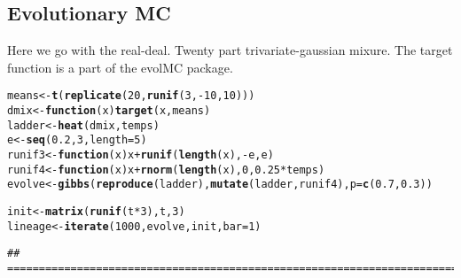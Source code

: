 \documentclass{article}\usepackage[]{graphicx}\usepackage[]{color}
\makeatletter
\newcommand{\hlnum}[1]{\textcolor[rgb]{0.686,0.059,0.569}{#1}}%
\newcommand{\hlopt}[1]{\textcolor[rgb]{0,0,0}{#1}}%
\newcommand{\hlstd}[1]{\textcolor[rgb]{0.345,0.345,0.345}{#1}}%
\newcommand{\hlkwa}[1]{\textcolor[rgb]{0.161,0.373,0.58}{\textbf{#1}}}%
\newcommand{\hlkwb}[1]{\textcolor[rgb]{0.69,0.353,0.396}{#1}}%
\newcommand{\hlkwc}[1]{\textcolor[rgb]{0.333,0.667,0.333}{#1}}%
\newcommand{\hlkwd}[1]{\textcolor[rgb]{0.737,0.353,0.396}{\textbf{#1}}}%
\newenvironment{kframe}{%
 \def\at@end@of@kframe{}%
 \ifinner\ifhmode%
  \def\at@end@of@kframe{\end{minipage}}%
  \begin{minipage}{\columnwidth}%
 \fi\fi%
 \def\FrameCommand##1{\hskip\@totalleftmargin \hskip-\fboxsep
 \colorbox{shadecolor}{##1}\hskip-\fboxsep
     \hskip-\linewidth \hskip-\@totalleftmargin \hskip\columnwidth}%
 \MakeFramed {\advance\hsize-\width
   \@totalleftmargin\z@ \linewidth\hsize
   \@setminipage}}%
 {\par\unskip\endMakeFramed%
 \at@end@of@kframe}
\newenvironment{knitrout}{}{} %
\makeatother
\begin{document}
\subsection{Evolutionary MC}

Here we go with the real-deal. Twenty part trivariate-gaussian mixure.
The target function is a part of the evolMC package. 

\begin{knitrout}
\color{fgcolor}\begin{kframe}
\begin{alltt}
\hlstd{means} \hlkwb{<-} \hlkwd{t}\hlstd{(}\hlkwd{replicate}\hlstd{(}\hlnum{20}\hlstd{,} \hlkwd{runif}\hlstd{(}\hlnum{3}\hlstd{,} \hlopt{-}\hlnum{10}\hlstd{,} \hlnum{10}\hlstd{)))}
\hlstd{dmix} \hlkwb{<-} \hlkwa{function}\hlstd{(}\hlkwc{x}\hlstd{)} \hlkwd{target}\hlstd{(x, means)}
\hlstd{ladder} \hlkwb{<-} \hlkwd{heat}\hlstd{(dmix, temps)}
\hlstd{e} \hlkwb{<-} \hlkwd{seq}\hlstd{(}\hlnum{0.2}\hlstd{,} \hlnum{3}\hlstd{,} \hlkwc{length} \hlstd{=} \hlnum{5}\hlstd{)}
\hlstd{runif3} \hlkwb{<-} \hlkwa{function}\hlstd{(}\hlkwc{x}\hlstd{) x} \hlopt{+} \hlkwd{runif}\hlstd{(}\hlkwd{length}\hlstd{(x),} \hlopt{-}\hlstd{e, e)}
\hlstd{runif4} \hlkwb{<-} \hlkwa{function}\hlstd{(}\hlkwc{x}\hlstd{) x} \hlopt{+} \hlkwd{rnorm}\hlstd{(}\hlkwd{length}\hlstd{(x),} \hlnum{0}\hlstd{,} \hlnum{0.25} \hlopt{*} \hlstd{temps)}
\hlstd{evolve} \hlkwb{<-} \hlkwd{gibbs}\hlstd{(}\hlkwd{reproduce}\hlstd{(ladder),} \hlkwd{mutate}\hlstd{(ladder, runif4),} \hlkwc{p} \hlstd{=} \hlkwd{c}\hlstd{(}\hlnum{0.7}\hlstd{,} \hlnum{0.3}\hlstd{))}

\hlstd{init} \hlkwb{<-} \hlkwd{matrix}\hlstd{(}\hlkwd{runif}\hlstd{(t} \hlopt{*} \hlnum{3}\hlstd{), t,} \hlnum{3}\hlstd{)}
\hlstd{lineage} \hlkwb{<-} \hlkwd{iterate}\hlstd{(}\hlnum{1000}\hlstd{, evolve, init,} \hlkwc{bar} \hlstd{=} \hlnum{1}\hlstd{)}
\end{alltt}
\begin{verbatim}
## ===========================================================================
\end{verbatim}
\end{kframe}
\end{knitrout}
\end{document}
